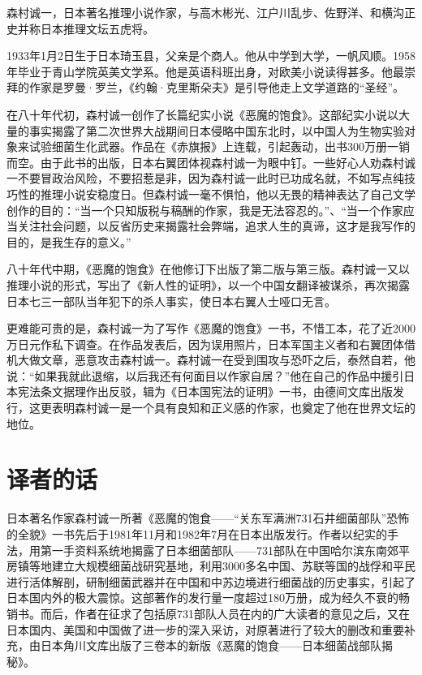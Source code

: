 \documentclass[a4paper,12pt,UTF8,twoside]{ctexbook}
\begin{document}
森村诚一，日本著名推理小说作家，与高木彬光、江户川乱步、佐野洋、和横沟正史并称日本推理文坛五虎将。

1933年1月2日生于日本琦玉县，父亲是个商人。他从中学到大学，一帆风顺。1958年毕业于青山学院英美文学系。他是英语科班出身，对欧美小说读得甚多。他最崇拜的作家是罗曼·罗兰，《约翰·克里斯朵夫》是引导他走上文学道路的“圣经”。

在八十年代初，森村诚一创作了长篇纪实小说《恶魔的饱食》。这部纪实小说以大量的事实揭露了第二次世界大战期间日本侵略中国东北时，以中国人为生物实验对象来试验细菌生化武器。作品在《赤旗报》上连载，引起轰动，出书300万册一销而空。由于此书的出版，日本右翼团体视森村诚一为眼中钉。一些好心人劝森村诚一不要冒政治风险，不要招惹是非，因为森村诚一此时已功成名就，不如写点纯技巧性的推理小说安稳度日。但森村诚一毫不惧怕，他以无畏的精神表达了自己文学创作的目的：“当一个只知版税与稿酬的作家，我是无法容忍的。”、“当一个作家应当关注社会问题，以反省历史来揭露社会弊端，追求人生的真谛，这才是我写作的目的，是我生存的意义。”

八十年代中期，《恶魔的饱食》在他修订下出版了第二版与第三版。森村诚一又以推理小说的形式，写出了《新人性的证明》，以一个中国女翻译被谋杀，再次揭露日本七三一部队当年犯下的杀人事实，使日本右翼人士哑口无言。

更难能可贵的是，森村诚一为了写作《恶魔的饱食》一书，不惜工本，花了近2000万日元作私下调查。在作品发表后，因为误用照片，日本军国主义者和右翼团体借机大做文章，恶意攻击森村诚一。森村诚一在受到围攻与恐吓之后，泰然自若，他说：“如果我就此退缩，以后我还有何面目以作家自居？”他在自己的作品中援引日本宪法条文据理作出反驳，辑为《日本国宪法的证明》一书，由德间文库出版发行，这更表明森村诚一是一个具有良知和正义感的作家，也奠定了他在世界文坛的地位。

\chapter{译者的话}

日本著名作家森村诚一所著《恶魔的饱食——“关东军满洲731石井细菌部队”恐怖的全貌》一书先后于1981年11月和1982年7月在日本出版发行。作者以纪实的手法，用第一手资料系统地揭露了日本细菌部队——731部队在中国哈尔滨东南郊平房镇等地建立大规模细菌战研究基地，利用3000多名中国、苏联等国的战俘和平民进行活体解剖，研制细菌武器并在中国和中苏边境进行细菌战的历史事实，引起了日本国内外的极大震惊。这部著作的发行量一度超过180万册，成为经久不衰的畅销书。而后，作者在征求了包括原731部队人员在内的广大读者的意见之后，又在日本国内、美国和中国做了进一步的深入采访，对原著进行了较大的删改和重要补充，由日本角川文库出版了三卷本的新版《恶魔的饱食——日本细菌战部队揭秘》。
\end{document}
